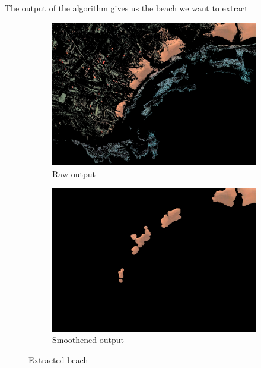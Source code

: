 \begin{enumerate}
    The output of the algorithm gives us the beach we want to extract
    \begin{figure}[!ht]
        \centering
        \begin{subfigure}{0.45\textwidth}
            \centering
            \includegraphics[width=\textwidth]{Doc/Graphics/Part4/kNN_classified_beach.png}
            \caption{Raw output}
        \end{subfigure} \hfill
        \begin{subfigure}{0.45\textwidth}
            \centering
            \includegraphics[width=\textwidth]{Doc/Graphics/Part4/kNN_masked_beach.png}
            \caption{Smoothened output}
        \end{subfigure}
        \caption{Extracted beach}
        \label{fig:enter-label}
    \end{figure}  
    \FloatBarrier
    

\end{enumerate}
